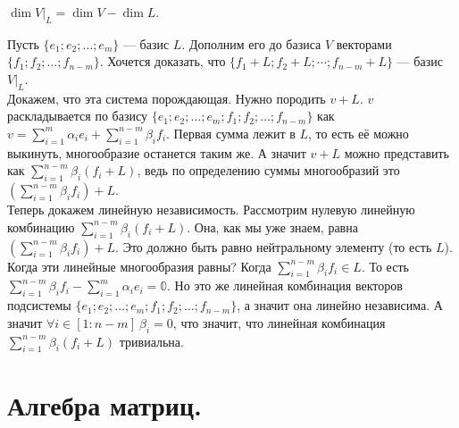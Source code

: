 \documentclass{article}
\begin{document}
\begin{itemize}
\begin{Proof}
        \end{Proof}
        \thm $\dim V\big|_L=\dim V-\dim L$.
        \begin{Proof}
            Пусть $\{e_1;e_2;\ldots;e_m\}$ --- базис $L$. Дополним его до базиса $V$ векторами $\{f_1;f_2;\ldots;f_{n-m}\}$. Хочется доказать, что $\{f_1+L;f_2+L;\cdots;f_{n-m}+L\}$ --- базис $V\big|_L$.\\
            Докажем, что эта система порождающая. Нужно породить $v+L$. $v$ раскладывается по базису $\{e_1;e_2;\ldots;e_m;f_1;f_2;\ldots;f_{n-m}\}$ как $v=\sum\limits_{i=1}^m\alpha_ie_i+\sum\limits_{i=1}^{n-m}\beta_if_i$. Первая сумма лежит в $L$, то есть её можно выкинуть, многообразие останется таким же. А значит $v+L$ можно представить как $\sum\limits_{i=1}^{n-m}\beta_i(f_i+L)$, ведь по определению суммы многообразий это $\left(\sum\limits_{i=1}^{n-m}\beta_if_i\right)+L$.\\
            Теперь докажем линейную независимость. Рассмотрим нулевую линейную комбинацию $\sum\limits_{i=1}^{n-m}\beta_i(f_i+L)$. Она, как мы уже знаем, равна $\left(\sum\limits_{i=1}^{n-m}\beta_if_i\right)+L$. Это должно быть равно нейтральному элементу (то есть $L$). Когда эти линейные многообразия равны? Когда $\sum\limits_{i=1}^{n-m}\beta_if_i\in L$. То есть $\sum\limits_{i=1}^{n-m}\beta_if_i-\sum\limits_{i=1}^{m}\alpha_ie_i=\mathbb0$. Но это же линейная комбинация векторов подсистемы $\{e_1;e_2;\ldots;e_m;f_1;f_2;\ldots;f_{n-m}\}$, а значит она линейно независима. А значит $\forall i\in[1:n-m]~\beta_i=0$, что значит, что линейная комбинация $\sum\limits_{i=1}^{n-m}\beta_i(f_i+L)$ тривиальна.
        \end{Proof}
    \end{itemize}
    \section{Алгебра матриц.}
\end{document}
